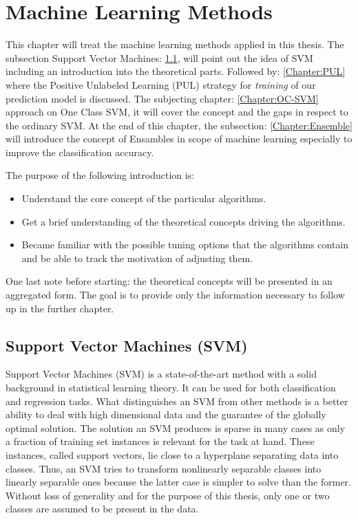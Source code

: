 \chapter{Machine Learning Methods}\label{ch:3}
This chapter will treat the machine learning methods applied in this thesis. The subsection Support Vector Machines: \ref{Chapter:SVM}, will point out the idea of SVM including an introduction into the theoretical parts. Followed by: \ref{Chapter:PUL} where the Positive Unlabeled Learning (PUL) strategy for \textit{training} of our prediction model is discussed. The subjecting chapter: \ref{Chapter:OC-SVM} approach on One Class SVM, it will cover the concept and the gaps in respect to the ordinary SVM. At the end of this chapter, the subsection: \ref{Chapter:Ensemble} will introduce the concept of Ensambles in scope of machine learning especially to improve the classification accuracy.

The purpose of the following introduction is:
\begin{itemize}
    \item Understand the core concept of the particular algorithms.
    
    \item Get a brief understanding of the theoretical concepts driving the algorithms.
    
    \item Became familiar with the possible tuning options that the algorithms contain and be able to track the motivation of adjusting them.
\end{itemize}
One last note before starting: the theoretical concepts will be presented in an aggregated form. The goal is to provide only the information necessary to follow up in the further chapter. 


\section {Support Vector Machines (SVM)}\label{Chapter:SVM}

Support Vector Machines (SVM) \cite{Cortes;Vapnik:1995} is a state-of-the-art method with a solid background in statistical learning theory. It can be used for both classification and regression tasks. What distinguishes an SVM from other methods is a better ability to deal with high dimensional data and the guarantee of the globally optimal solution. The solution an SVM produces is sparse in many cases as only a fraction of training set instances is relevant for the task at hand. These instances, called support vectors, lie close to a hyperplane separating data into classes. Thus, an SVM tries to transform nonlinearly separable classes into linearly separable ones because the latter case is simpler to solve than the former. Without loss of generality and for the purpose of this thesis, only one or two classes are assumed to be present in the data.

